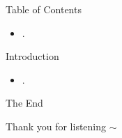 \documentclass[notheorems,xcolor=dvipsnames]{beamer}
\title{}
\author{}
\theoremstyle{definition}
\begin{document}
\begin{frame}
  \titlepage
\end{frame}

\begin{frame}{\LARGE Table of Contents}
  \begin{itemize}
    \item .
  \end{itemize}
\end{frame}

\begin{frame}{\LARGE Introduction}
  \large
  \begin{itemize}
    \item .
  \end{itemize}
\end{frame}

%

\begin{frame}{\LARGE The End}
  \LARGE
  \begin{center}
    Thank you for listening $\sim$ 
  \end{center}
\end{frame}
\end{document}
